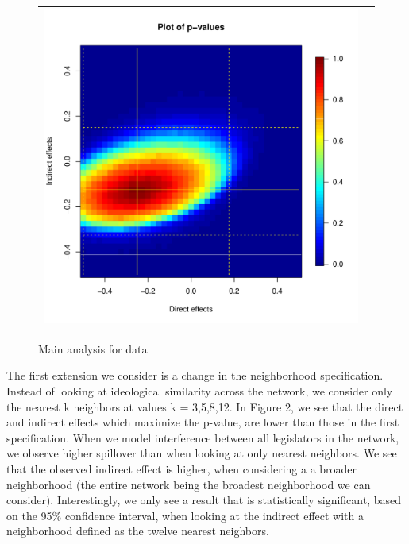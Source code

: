 \documentclass[12pt]{article}
\begin{document}
\begin{figure}
	\centering
	\begin{tabular}{cc}
	\includegraphics[scale=0.45]{./images/pval_plot_coppock_replication.pdf}
	\end{tabular}
	\caption{Main analysis for \citet{butler2011can} data}
\end{figure}


The first extension we consider is a change in the neighborhood specification. Instead of looking at ideological similarity across the network, we consider only the nearest k neighbors at values k = 3,5,8,12. In Figure 2, we see that the direct and indirect effects which maximize the p-value, are lower than those in the first specification. When we model interference between all legislators in the network, we observe higher spillover than when looking at only nearest neighbors. We see that the observed indirect effect is higher, when considering a a broader neighborhood (the entire network being the broadest neighborhood we can consider). Interestingly, we only see a result that is statistically significant, based on the 95\% confidence interval, when looking at the indirect effect with a neighborhood defined as the twelve nearest neighbors. 
\end{document}
